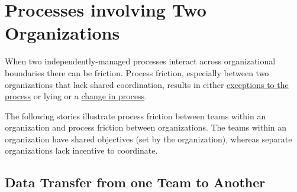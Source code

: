 \section{Processes involving Two Organizations\label{sec:processes-two-organizations}}

When two independently-managed processes interact across organizational boundaries there can be friction. Process friction, especially between two  organizations that lack shared coordination, results in either \hyperref[sec:exceptions-to-process]{exceptions to the process} 
or lying or a \hyperref[sec:change-a-process]{change in process}.

The following stories illustrate process friction between teams within an organization and process friction between organizations. The teams within an organization have shared objectives (set by the organization), whereas separate organizations lack incentive to coordinate. 

\subsection*{Data Transfer from one Team to Another}

